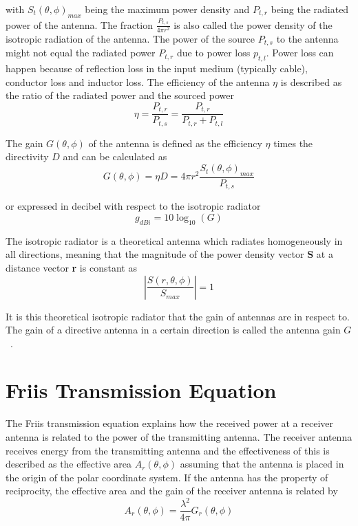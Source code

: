 with $S_ t\left(\theta, \phi\right)_{max}$ being the maximum power density and $P_{t,r}$ being the radiated power of the antenna. The fraction $\frac{P_{t,s}}{4 \pi r^2}$ is also called the power density of the isotropic radiation of the antenna. The power of the source $P_{t,s}$ to the antenna might not equal the radiated power $P_{t,r}$ due to power loss $p_{t,l}$. Power loss can happen because of reflection loss in the input medium (typically cable), conductor loss and inductor loss. The efficiency of the antenna $\eta$ is described as the ratio of the radiated power and the sourced power
\begin{equation} \label{eq:antenna_efficiency}
    \eta = \frac{P_{t,r}}{P_{t,s}} = \frac{P_{t,r}}{P_{t,r}+P_{t,l}}
\end{equation}

The gain $G \left( \theta, \phi \right)$ of the antenna is defined as the efficiency $\eta$ times the directivity $D$ and can be calculated as
\begin{equation} \label{eq:gain}
    G \left( \theta, \phi \right) = \eta  D = 4 \pi r^2 \frac{S_t \left(\theta, \phi\right)_{max}}{P_{t,s}}
\end{equation}

or expressed in decibel with respect to the isotropic radiator
\begin{equation} \label{eq:gain_dbi}
    g_{dBi} = 10 \log_{10}\left(G\right)
\end{equation}

The isotropic radiator is a theoretical antenna which radiates homogeneously in all directions, meaning that the magnitude of the power density vector \textbf{S} at a distance vector \textbf{r} is constant as
\begin{equation} \label{eq:isotropic_radiation}
    \left| \frac{S \left(r, \theta, \phi \right)}{S_{max}} \right|=1
\end{equation}

It is this theoretical isotropic radiator that the gain of antennas are in respect to. The gain of a directive antenna in a certain direction is called the antenna gain $G$~\cite[pp. 10-12]{ant_beam_form}.

\section{Friis Transmission Equation}
The Friis transmission equation explains how the received power at a receiver antenna is related to the power of the transmitting antenna. The receiver antenna receives energy from the transmitting antenna and the effectiveness of this is described as the effective area $A_r\left( \theta, \phi \right)$ assuming that the antenna is placed in the origin of the polar coordinate system. If the antenna has the property of reciprocity, the effective area and the gain of the receiver antenna is related by 
\begin{equation} \label{eq:effectivate_area}
    A_r \left( \theta, \phi \right) = \frac{\lambda^2}{4 \pi} G_r \left( \theta, \phi \right)
\end{equation}

